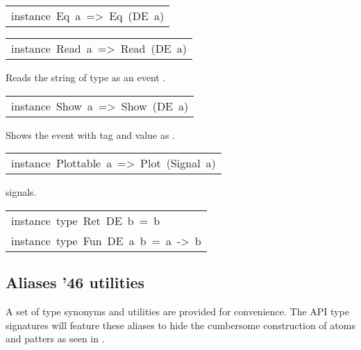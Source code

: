 \begin{haddockdesc}
\item[\begin{tabular}{@{}l}
instance\ Eq\ a\ =>\ Eq\ (DE\ a)
\end{tabular}]

\item[\begin{tabular}{@{}l}
instance\ Read\ a\ =>\ Read\ (DE\ a)
\end{tabular}]\haddockbegindoc
Reads the string of type  as an event .\par


\item[\begin{tabular}{@{}l}
instance\ Show\ a\ =>\ Show\ (DE\ a)
\end{tabular}]\haddockbegindoc
Shows the event with tag  and value  as .\par


\item[\begin{tabular}{@{}l}
instance\ Plottable\ a\ =>\ Plot\ (Signal\ a)
\end{tabular}]\haddockbegindoc
{} signals.\par


\item[\begin{tabular}{@{}l}
instance\ type\ Ret\ DE\ b\ =\ b\\instance\ type\ Fun\ DE\ a\ b\ =\ a\ ->\ b
\end{tabular}]
\end{haddockdesc}
\subsection{Aliases {\char '46} utilities}
A set of type synonyms and utilities are provided for
 convenience. The API type signatures will feature these aliases
 to hide the cumbersome construction of atoms and patters as seen
 in .\par

